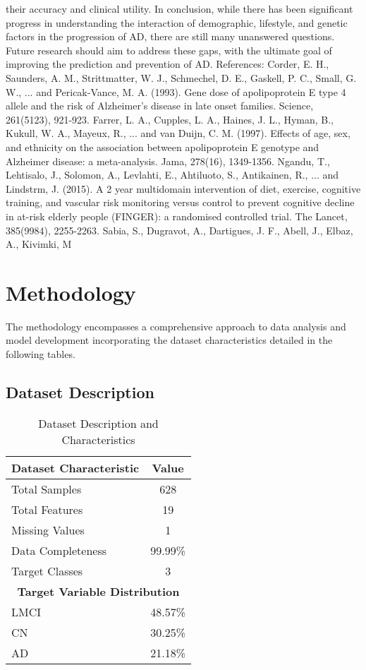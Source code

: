 \documentclass[conference]{IEEEtran}
\begin{document}
their accuracy and clinical utility. In conclusion, while there has been significant progress in understanding the interaction of demographic, lifestyle, and genetic factors in the progression of AD, there are still many unanswered questions. Future research should aim to address these gaps, with the ultimate goal of improving the prediction and prevention of AD. References: Corder, E. H., Saunders, A. M., Strittmatter, W. J., Schmechel, D. E., Gaskell, P. C., Small, G. W., ... and Pericak-Vance, M. A. (1993). Gene dose of apolipoprotein E type 4 allele and the risk of Alzheimer's disease in late onset families. Science, 261(5123), 921-923. Farrer, L. A., Cupples, L. A., Haines, J. L., Hyman, B., Kukull, W. A., Mayeux, R., ... and van Duijn, C. M. (1997). Effects of age, sex, and ethnicity on the association between apolipoprotein E genotype and Alzheimer disease: a meta-analysis. Jama, 278(16), 1349-1356. Ngandu, T., Lehtisalo, J., Solomon, A., Levlahti, E., Ahtiluoto, S., Antikainen, R., ... and Lindstrm, J. (2015). A 2 year multidomain intervention of diet, exercise, cognitive training, and vascular risk monitoring versus control to prevent cognitive decline in at-risk elderly people (FINGER): a randomised controlled trial. The Lancet, 385(9984), 2255-2263. Sabia, S., Dugravot, A., Dartigues, J. F., Abell, J., Elbaz, A., Kivimki, M

\section{Methodology}
The methodology encompasses a comprehensive approach to data analysis and model development incorporating the dataset characteristics detailed in the following tables.

\subsection{Dataset Description}

\begin{table}[!h]
\centering
\caption{Dataset Description and Characteristics}
\label{tab:dataset_description}
\begin{tabular}{|l|c|}
\hline
\textbf{Dataset Characteristic} & \textbf{Value} \\
\hline
Total Samples & 628 \\
\hline
Total Features & 19 \\
\hline
Missing Values & 1 \\
\hline
Data Completeness & 99.99\% \\
\hline
Target Classes & 3 \\
\hline
\hline
\multicolumn{2}{|c|}{\textbf{Target Variable Distribution}} \\
\hline
LMCI & 48.57\% \\
\hline
CN & 30.25\% \\
\hline
AD & 21.18\% \\
\hline
\end{tabular}
\end{table}
\end{document}
